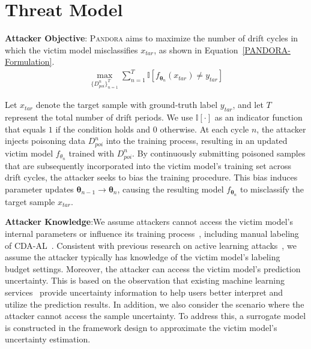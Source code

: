 \documentclass[lettersize,journal]{IEEEtran}
\newcommand{\pandora}{{\scshape Pandora}\xspace}
\begin{document}
\section{Threat Model}
\label{Sec: Threat Model}
\textbf{Attacker Objective}: \pandora aims to maximize the number of drift cycles in which the victim model misclassifies $x_{tar}$, as shown in Equation~\ref{PANDORA-Formulation}.
\begin{equation}
	\begin{aligned}
			\max_{ \{ D_{poi}^{n} \}_{n=1}^{T} } \sum_{n=1}^{T} \mathbb{I}[ f_{\bm{\theta}_{n}}(x_{tar}) \neq y_{tar} ]
	\end{aligned}
	\label{PANDORA-Formulation}
\end{equation}

Let $x_{tar}$ denote the target sample with ground-truth label $y_{tar}$, and let $T$ represent the total number of drift periods.
We use $\mathbb{I}[\cdot]$ as an indicator function that equals $1$ if the condition holds and $0$ otherwise.
At each cycle $n$, the attacker injects poisoning data $D_{poi}^{n}$ into the training process, resulting in an updated victim model $f_{\theta_{n}}$ trained with $D_{poi}^{n}$.
By continuously submitting poisoned samples that are subsequently incorporated into the victim model's training set across drift cycles, the attacker seeks to bias the training procedure. 
This bias induces parameter updates $\bm{\theta}_{n-1}\to\bm{\theta}_n$, causing the resulting model $f_{\bm{\theta}_n}$ to misclassify the target sample $x_{tar}$.



\textbf{Attacker Knowledge}:We assume attackers cannot access the victim model's internal parameters or influence its training process~\cite{2017-ASIACCS-Black-Box-Attack}, including manual labeling of CDA-AL~\cite{2023-Usenix-chenyizhen}.
Consistent with previous research on active learning attacks~\cite{2021-Usenix-active-learning-backdoor}, we assume the attacker typically has knowledge of the victim model's labeling budget settings.
Moreover, the attacker can access the victim model’s prediction uncertainty.
This is based on the observation that existing machine learning services~\cite{2025-Baidu-Image-Recognition} provide uncertainty information to help users better interpret and utilize the prediction results.
In addition, we also consider the scenario where the attacker cannot access the sample uncertainty. To address this, a surrogate model is constructed in the framework design to approximate the victim model’s uncertainty estimation.
\end{document}
